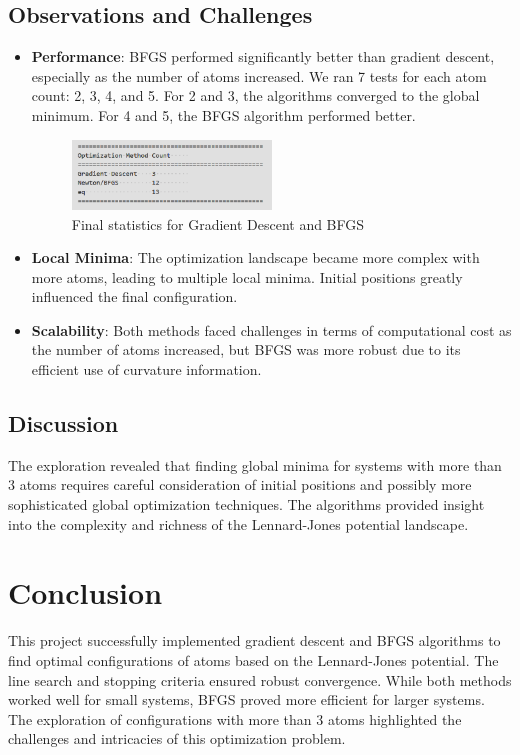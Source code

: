 \documentclass[11pt,onecolumn]{article}
\begin{document}
\subsection*{Observations and Challenges}
\begin{itemize}
    \item \textbf{Performance}: BFGS performed significantly better than gradient descent, especially as the number of atoms increased. We ran 7 tests for each atom count: 2, 3, 4, and 5. For 2 and 3, the algorithms converged to the global minimum. For 4 and 5, the BFGS algorithm performed better.
      \begin{figure}[H]
        \includegraphics[width=0.5\textwidth]{final_stats.png}
        \centering
        \caption{Final statistics for Gradient Descent and BFGS}
    \end{figure}
    \item \textbf{Local Minima}: The optimization landscape became more complex with more atoms, leading to multiple local minima. Initial positions greatly influenced the final configuration.
    \item \textbf{Scalability}: Both methods faced challenges in terms of computational cost as the number of atoms increased, but BFGS was more robust due to its efficient use of curvature information.
\end{itemize}

\subsection*{Discussion}
The exploration revealed that finding global minima for systems with more than 3 atoms requires careful consideration of initial positions and possibly more sophisticated global optimization techniques. The algorithms provided insight into the complexity and richness of the Lennard-Jones potential landscape.

\section*{Conclusion}
This project successfully implemented gradient descent and BFGS algorithms to find optimal configurations of atoms based on the Lennard-Jones potential. The line search and stopping criteria ensured robust convergence. While both methods worked well for small systems, BFGS proved more efficient for larger systems. The exploration of configurations with more than 3 atoms highlighted the challenges and intricacies of this optimization problem.
\end{document}
